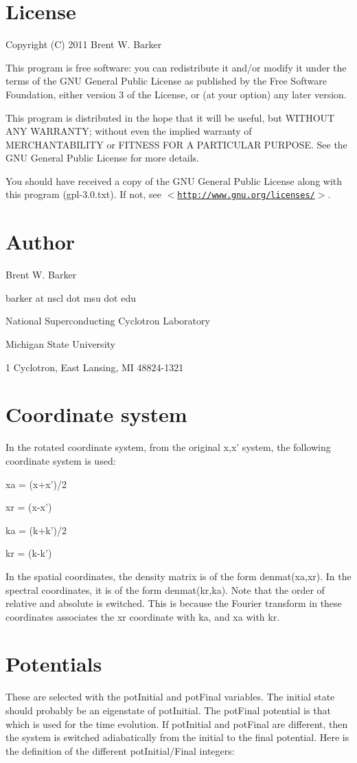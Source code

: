 \hypertarget{index_license}{}\section{License}\label{index_license}
Copyright (C) 2011 Brent W. Barker

This program is free software: you can redistribute it and/or modify it under the terms of the GNU General Public License as published by the Free Software Foundation, either version 3 of the License, or (at your option) any later version.

This program is distributed in the hope that it will be useful, but WITHOUT ANY WARRANTY; without even the implied warranty of MERCHANTABILITY or FITNESS FOR A PARTICULAR PURPOSE. See the GNU General Public License for more details.

You should have received a copy of the GNU General Public License along with this program (gpl-\/3.0.txt). If not, see $<$\href{http://www.gnu.org/licenses/}{\tt http://www.gnu.org/licenses/}$>$.\hypertarget{index_author}{}\section{Author}\label{index_author}
Brent W. Barker\par
 barker at nscl dot msu dot edu\par
 National Superconducting Cyclotron Laboratory\par
 Michigan State University\par
 1 Cyclotron, East Lansing, MI 48824-\/1321\hypertarget{index_coords}{}\section{Coordinate system}\label{index_coords}
In the rotated coordinate system, from the original x,x' system, the following coordinate system is used:

{\ttfamily  xa = (x+x')/2 \par
 xr = (x-\/x') \par
 ka = (k+k')/2 \par
 kr = (k-\/k') \par
 }

In the spatial coordinates, the density matrix is of the form {\ttfamily denmat(xa,xr)}. In the spectral coordinates, it is of the form {\ttfamily denmat(kr,ka)}. Note that the order of relative and absolute is switched. This is because the Fourier transform in these coordinates associates the xr coordinate with ka, and xa with kr.\hypertarget{index_potentials}{}\section{Potentials}\label{index_potentials}
These are selected with the potInitial and potFinal variables. The initial state should probably be an eigenstate of {\ttfamily potInitial}. The {\ttfamily potFinal} potential is that which is used for the time evolution. If potInitial and potFinal are different, then the system is switched adiabatically from the initial to the final potential. Here is the definition of the different potInitial/Final integers:

